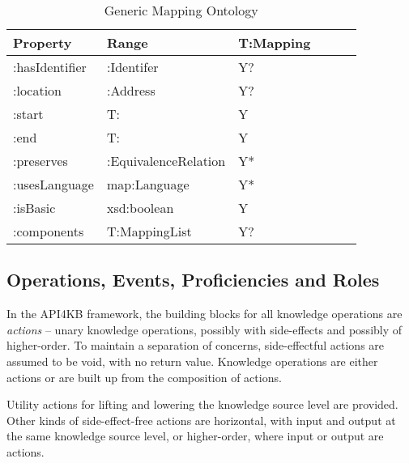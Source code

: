 \documentclass[runningheads]{llncs}
\begin{document}
\begin{table}[h]
\centering
\begin{tabular}{|l|l|l|l|l|l|}
 \hline
\textbf{Property} & \textbf{Range} & \textbf{T:Mapping}   \\ \hline
:hasIdentifier    & :Identifer     &  Y?                       \\ \hline
:location         & :Address       &  Y?                       \\ \hline
:start          & T:               &  Y                       \\ \hline
:end            & T:               &  Y                       \\ \hline
:preserves        & :EquivalenceRelation    &  Y*              \\ \hline
:usesLanguage     & map:Language    &  Y*              \\ \hline
:isBasic         & xsd:boolean     &  Y              \\ \hline
:components      & T:MappingList     &  Y?              \\ \hline
\end{tabular}
\caption{Generic Mapping Ontology}
\label{krmaponto}
\end{table}


\subsection{Operations, Events, Proficiencies and Roles}
\label{sec:op}

In the API4KB framework, the building blocks for all knowledge operations are \emph{actions} -- unary knowledge operations, possibly with side-effects and possibly of higher-order. To maintain a separation of concerns, side-effectful actions are assumed to be void, with no return value. Knowledge operations are either actions or are built up from the composition of actions. 

Utility actions for lifting and lowering the knowledge source level are provided. Other kinds of side-effect-free actions are horizontal, with input and output at the same knowledge source level, or higher-order, where input or output are actions.
\end{document}
